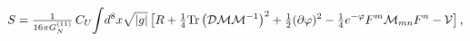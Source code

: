\begin{equation}
\label{eq:8dtruncaction}
S  =  
{\textstyle\frac{1}{16\pi G_{N}^{(11)}}}\, C_U
{\displaystyle\int} d^{8}x \sqrt{|g|}\,
 \big[ R
+{\textstyle\frac{1}{4}}{\rm Tr}\left({\cal D} {\cal M}{\cal M}^{-1}\right)^{2}
+{\textstyle\frac{1}{2}}(\partial \varphi)^2 
- {\textstyle\frac{1}{4}}e^{-\varphi}F^{m}{\cal M}_{mn} F^{n}
- {\cal V} \big] \, ,
\end{equation}

